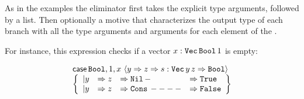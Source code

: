 



As in the examples the \case{} eliminator first takes the explicit type arguments, followed by a \scrut{} list. %
Then optionally a motive that characterizes the output type of each branch with all the type arguments and arguments for each element of the \scruts{}. %

For instance, this \case{} expression checks if a vector $x:\mathtt{Vec}{}\,\mathtt{Bool}{}\,1$ is empty:

\[
  \begin{array}{l}
  \mathsf{case}{}\,\mathtt{Bool}{},1,x\,\left\langle y\Rightarrow z\Rightarrow s:\mathtt{Vec}{}\,y\,z\Rightarrow\mathtt{Bool}{}\right\rangle \\
 \left\{ 
    \begin{array}{llll}
    | y&\Rightarrow z&\Rightarrow \mathtt{Nil}{}\,-&\Rightarrow \mathtt{True}{} \\
    | y&\Rightarrow z&\Rightarrow \mathtt{Cons}{}\,----&\Rightarrow \mathtt{False}{}
    \end{array}
    \right\} 
\end{array}
\]

